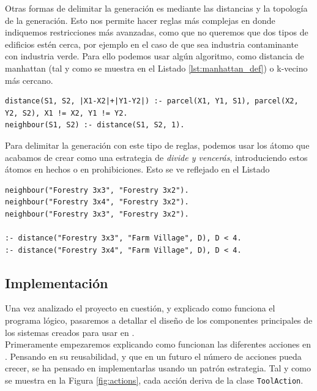 Otras formas de delimitar la generación es mediante las distancias y la topología de la generación. Esto nos permite hacer reglas más complejas en donde indiquemos restricciones más avanzadas, como que no queremos que dos tipos de edificios estén cerca, por ejemplo en el caso de que sea industria contaminante con industria verde. Para ello podemos usar algún algoritmo, como distancia de manhattan (tal y como se muestra en el Listado \ref{lst:manhattan_def}) o k-vecino más cercano. \\

\newpage

\begin{lstlisting}[caption={Cálculo de la distancia del taxista en Aswer Set Programing},captionpos=b,label=lst:manhattan_def]
distance(S1, S2, |X1-X2|+|Y1-Y2|) :- parcel(X1, Y1, S1), parcel(X2, Y2, S2), X1 != X2, Y1 != Y2.
neighbour(S1, S2) :- distance(S1, S2, 1).
\end{lstlisting}

Para delimitar la generación con este tipo de reglas, podemos usar los átomo que acabamos de crear como una estrategia de \textit{divide y vencerás}, introduciendo estos átomos en hechos o en prohibiciones. Esto se ve reflejado en el Listado

\begin{lstlisting}[caption={Prohibiciones de generación de edificios},captionpos=b,label=lst:distance_rules]
neighbour("Forestry 3x3", "Forestry 3x2").
neighbour("Forestry 3x4", "Forestry 3x2").
neighbour("Forestry 3x3", "Forestry 3x2").

:- distance("Forestry 3x3", "Farm Village", D), D < 4.
:- distance("Forestry 3x4", "Farm Village", D), D < 4.
\end{lstlisting}

\subsection{Implementación}
\label{subsec:implementacion}

Una vez analizado el proyecto en cuestión, y explicado como funciona el programa lógico, pasaremos a detallar el diseño de los componentes principales de los sistemas creados para usar en \cities. \\

Primeramente empezaremos explicando como funcionan las diferentes acciones en \industrylp. Pensando en su reusabilidad, y que en un futuro el número de acciones pueda crecer, se ha pensado en implementarlas usando un patrón estrategia. Tal y como se muestra en la Figura \ref{fig:actions}, cada acción deriva de la clase \texttt{ToolAction}.\\


